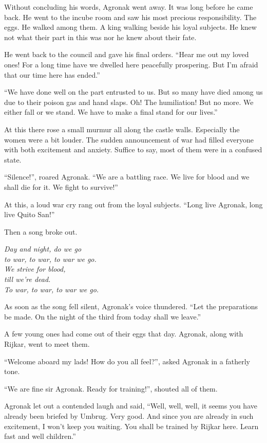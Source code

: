 \documentclass[twoside,11pt,titlepage]{article}
\begin{document}
Without concluding his words, Agronak went away. It was long before he came back. He went to the incube room and saw his most precious responsibility. The eggs. He walked among them. A king walking beside his loyal subjects. He knew not what their part in this was nor he knew about their fate.

He went back to the council and gave his final orders. ``Hear me out my loved ones! For a long time have we dwelled here peacefully prospering. But I'm afraid that our time here has ended.''

``We have done well on the part entrusted to us. But so many have died among us due to their poison gas and hand slaps. Oh! The humiliation! But no more. We either fall or we stand. We have to make a final stand for our lives.''

At this there rose a small murmur all along the castle walls. Especially the women were a bit louder. The sudden announcement of war had filled everyone with both excitement and anxiety. Suffice to say, most of them were in a confused state.

``Silence!'', roared Agronak. ``We are a battling race. We live for blood and we shall die for it. We fight to survive!''

At this, a loud war cry rang out from the loyal subjects. ``Long live Agronak, long live Quito San!''

Then a song broke out.\\
\medskip
\begin{center}
\emph{Day and night, do we go \\ to war, to war, to war we go. \\We strive for blood, \\till we're dead. \\To war, to war, to war we go.}
\end{center}

As soon as the song fell silent, Agronak's voice thundered. ``Let the preparations be made. On the night of the third from today shall we leave.''

A few young ones had come out of their eggs that day. Agronak, along with Rijkar, went to meet them.

``Welcome aboard my lads! How do you all feel?'', asked Agronak in a fatherly tone.

``We are fine sir Agronak. Ready for training!'', shouted all of them.

Agronak let out a contended laugh and said, ``Well, well, well, it seems you have already been briefed by Umbrug. Very good. And since you are already in such excitement, I won't keep you waiting. You shall be trained by Rijkar here. Learn fast and well children.''
\end{document}
